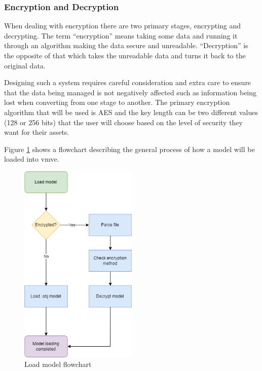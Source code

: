 \documentclass[11pt]{article}
\begin{document}
\subsubsection{Encryption and Decryption}
When dealing with encryption there are two primary stages, encrypting and
decrypting. The term ``encryption'' means taking some data and running it
through an algorithm making the data secure and unreadable. ``Decryption'' is
the opposite of that which takes the unreadable data and turns it back to the
original data.

Designing such a system requires careful consideration and extra care to ensure
that the data being managed is not negatively affected such as information being
lost when converting from one stage to another. The primary encryption algorithm
that will be used is AES and the key length can be two different values (128 or
256 bits) that the user will choose based on the level of security they want for
their assets.

Figure \ref{fig:load_model_flowchart} shows a flowchart describing the general
process of how a model will be loaded into \gls*{vmve}.

\begin{figure}[H]
  \centering
  \includegraphics[width=0.5\textwidth]{images/load_model_flowchart.png}
  \caption{Load model flowchart}
  \label{fig:load_model_flowchart}
\end{figure}
\end{document}
